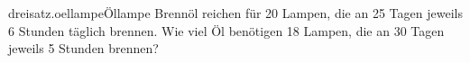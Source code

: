 \begin{exercise}{dreisatz.oellampe}{Öllampe}
  \ifproblem\problem
     Brennöl reichen für 20 Lampen, die an 25 Tagen jeweils 6 Stunden
    täglich brennen. Wie viel Öl benötigen 18 Lampen, die an 30 Tagen jeweils
    5 Stunden brennen?
  \fi
\end{exercise}
